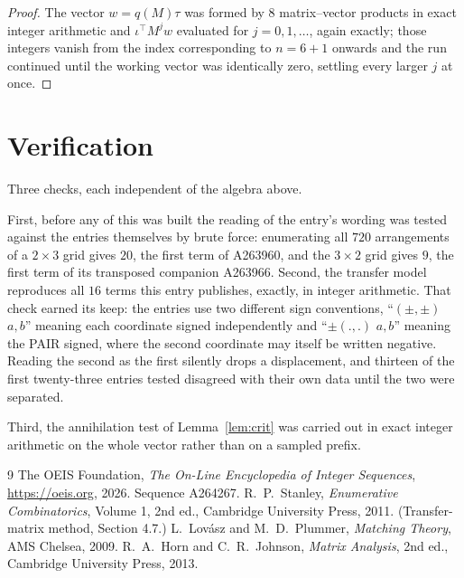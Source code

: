 \documentclass[11pt,a4paper]{article}
\theoremstyle{plain}
\theoremstyle{definition}
\begin{document}
\begin{proof}
The vector $w=q(M)\tau$ was formed by $8$ matrix--vector products in exact integer
arithmetic and $\iota^{\!\top}M^{j}w$ evaluated for $j=0,1,\dots$, again exactly; those
integers vanish from the index corresponding to $n=6+1$ onwards and the run continued
until the working vector was identically zero, settling every larger $j$ at once.
\end{proof}

\section{Verification}

Three checks, each independent of the algebra above.

First, before any of this was built the reading of the entry's wording was tested against the
entries themselves by brute force: enumerating all $720$ arrangements of a $2\times3$ grid
gives $20$, the first term of A263960, and the $3\times2$ grid gives $9$, the first term of its
transposed companion A263966. Second, the transfer model reproduces all $16$ terms this
entry publishes, exactly, in integer arithmetic. That check earned its keep: the entries use
two different sign conventions, ``$(\pm,\pm)$ $a,b$'' meaning each coordinate signed
independently and ``$\pm(.,.)$ $a,b$'' meaning the PAIR signed, where the second coordinate may
itself be written negative. Reading the second as the first silently drops a displacement, and
thirteen of the first twenty-three entries tested disagreed with their own data until the two
were separated.

Third, the annihilation test of Lemma~\ref{lem:crit} was carried out in exact integer
arithmetic on the whole vector rather than on a sampled prefix.

\begin{thebibliography}{9}
 The OEIS Foundation, \emph{The On-Line Encyclopedia of Integer
Sequences}, \url{https://oeis.org}, 2026. Sequence A264267.
 R.~P.~Stanley, \emph{Enumerative Combinatorics}, Volume 1, 2nd ed.,
Cambridge University Press, 2011. (Transfer-matrix method, Section 4.7.)
 L.~Lov\'asz and M.~D.~Plummer, \emph{Matching Theory}, AMS Chelsea, 2009.
 R.~A.~Horn and C.~R.~Johnson, \emph{Matrix Analysis}, 2nd ed., Cambridge
University Press, 2013.
\end{thebibliography}
\end{document}
